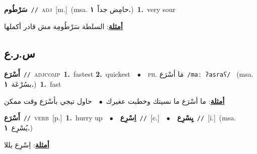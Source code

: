 \documentclass[10pt,a4paper,twoside]{article} %
\begin{document}
\begin{multicols}{2}
{\setlength\topsep{0pt}\textbf{\foreignlanguage{arabic}{سَرْطُوم}}\ {\color{gray}\texttt{//}\color{black}}\ \textsc{adj}\ [m.]\ \color{gray}(msa. \foreignlanguage{arabic}{حامِض جداً}~\foreignlanguage{arabic}{\textbf{١.}})\color{black}\ \textbf{1.}~very sour\  \begin{flushright}\color{gray}\foreignlanguage{arabic}{\textbf{\underline{\foreignlanguage{arabic}{أمثلة}}}: السلطة سَرْطُومِة مش قادر أكملها}\end{flushright}\color{black}} \vspace{2mm}

\vspace{-3mm}
\subsection*{\color{blue}\foreignlanguage{arabic}{س.ر.ع}\color{blue}{}} 

{\setlength\topsep{0pt}\textbf{\foreignlanguage{arabic}{أَسْرَع}}\ {\color{gray}\texttt{//}\color{black}}\ \textsc{adj\textunderscore comp}\ \textbf{1.}~fastest  \textbf{2.}~quickest\ \ $\bullet$\ \ \textsc{ph.} \color{gray} \foreignlanguage{arabic}{مَا أسْرَع}\color{black}\ {\color{gray}\texttt{/{\sffamily maː ʔasraʕ}/}\color{black}}\ \color{gray} (msa. \foreignlanguage{arabic}{بسُرْعَة}~\foreignlanguage{arabic}{\textbf{١.}})\color{black}\ \textbf{1.}~fast\  \begin{flushright}\color{gray}\foreignlanguage{arabic}{\textbf{\underline{\foreignlanguage{arabic}{أمثلة}}}: ما أسْرَع ما نسيتك وخطبت عغيرك\ $\bullet$\ \  حاول تيجي بأسْرَع وقت ممكن}\end{flushright}\color{black}} \vspace{2mm}

{\setlength\topsep{0pt}\textbf{\foreignlanguage{arabic}{أَسْرَع}}\ {\color{gray}\texttt{//}\color{black}}\ \textsc{verb}\ [p.]\ \textbf{1.}~hurry up\ \ $\bullet$\ \ \setlength\topsep{0pt}\textbf{\foreignlanguage{arabic}{اِسْرِع}}\ {\color{gray}\texttt{//}\color{black}}\ [c.]\ \ $\bullet$\ \ \setlength\topsep{0pt}\textbf{\foreignlanguage{arabic}{يِسْرِع}}\ {\color{gray}\texttt{//}\color{black}}\ [i.]\ \color{gray}(msa. \foreignlanguage{arabic}{يُسْرِع}~\foreignlanguage{arabic}{\textbf{١.}})\color{black}\  \begin{flushright}\color{gray}\foreignlanguage{arabic}{\textbf{\underline{\foreignlanguage{arabic}{أمثلة}}}: اِسْرِع يللا}\end{flushright}\color{black}} \vspace{2mm}


\end{multicols}
\end{document}
